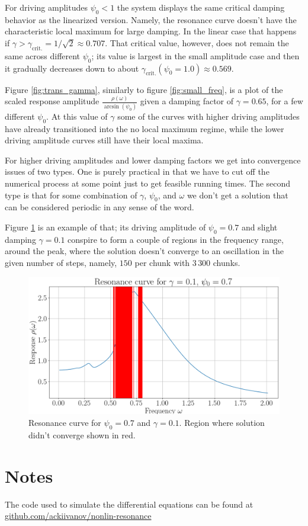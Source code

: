 \documentclass[10pt,a4paper,twocolumn]{article}
\begin{document}
For driving amplitudes $\psi_0 < 1$ the system displays the same critical damping behavior as the linearized version. Namely, the resonance curve doesn't have the characteristic local maximum for large damping. In the linear case that happens if $\gamma > \gamma_{\mathrm{crit.}} = 1/\sqrt{2} \approx 0.707$. That critical value, however, does not remain the same across different $\psi_0$; its value is largest in the small amplitude case and then it gradually decreases down to about $\gamma_{\mathrm{crit.}}(\psi_0 = 1.0) \approx 0.569$.

Figure \ref{fig:trans_gamma}, similarly to figure \ref{fig:small_freq}, is a plot of the scaled response amplitude $\frac{\rho(\omega)}{\arcsin(\psi_0)}$ given a damping factor of $\gamma = 0.65$, for a few different $\psi_0$. At this value of $\gamma$ some of the curves with higher driving amplitudes have already transitioned into the no local maximum regime, while the lower driving amplitude curves still have their local maxima.

For higher driving amplitudes and lower damping factors we get into convergence issues of two types. One is purely practical in that we have to cut off the numerical process at some point just to get feasible running times. The second type is that for some combination of $\gamma$, $\psi_0$, and $\omega$ we don't get a solution that can be considered periodic in any sense of the word. 

Figure \ref{fig:converg_issues} is an example of that; its driving amplitude of $\psi_0 = 0.7$ and slight damping $\gamma = 0.1$ conspire to form a couple of regions in the frequency range, around the peak, where the solution doesn't converge to an oscillation in the given number of steps, namely, $150$ per chunk with $3\,300$ chunks.


\begin{figure}[h]
\centering
\captionsetup{justification=centering}
\includegraphics[scale=0.25]{converg_issues.png}
\caption{Resonance curve for $\psi_0 = 0.7$ and $\gamma = 0.1$. Region where solution didn't converge shown in red.}
\label{fig:converg_issues}
\end{figure}

\section{Notes}

The code used to simulate the differential equations can be found at \href{https://github.com/ackiivanov/nonlin-resonance}{github.com/ackiivanov/nonlin-resonance}
\end{document}
